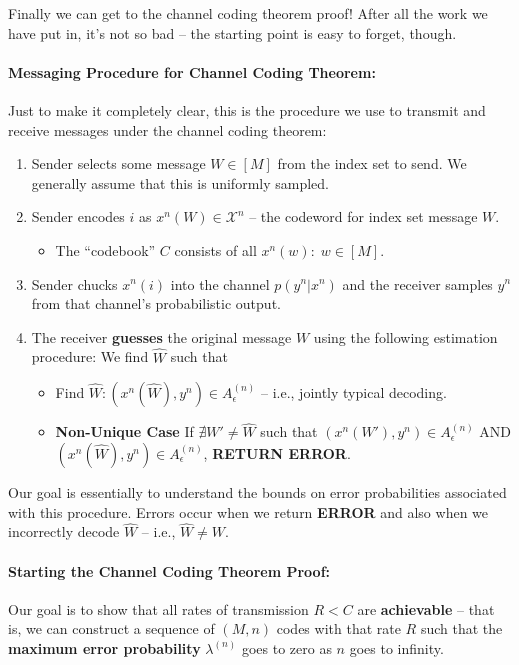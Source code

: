 \documentclass[a4paper,12pt]{report}
\begin{document}
Finally we can get to the channel coding theorem proof! After all the work we
have put in, it's not so bad -- the starting point is easy to forget, though.



\paragraph{Messaging Procedure for Channel Coding Theorem: } Just to make it
completely clear, this is the procedure we use to transmit and receive messages
under the channel coding theorem:
\begin{enumerate}
\item Sender selects some message $W\in [M]$ from the index set to send. We
generally assume that this is uniformly sampled. 
\item Sender encodes $i$ as $x^n(W) \in \mathcal X^n$ -- the codeword for index
set message $W$.
	\begin{itemize}
	\item The ``codebook'' $C$ consists of all $x^n(w): \; w\in [M]$. 
	\end{itemize}

\item Sender chucks $x^n(i)$ into the channel $p(y^n| x^n)$ and the receiver
samples $y^n$ from that channel's probabilistic output.
\item The receiver \textbf{guesses} the original message $W$ using the following
estimation procedure: We find $\hat W$ such that
	\begin{itemize}
	\item Find $\hat W: (x^n(\hat W), y^n) \in A_\epsilon^{(n)}$ -- i.e.,
	jointly typical decoding.
	\item \textbf{Non-Unique Case} If $\nexists W' \neq \hat W$ such that
	$(x^n(W'), y^n) \in A_\epsilon^{(n)}$ AND $(x^n(\hat W), y^n) \in
	A_\epsilon^{(n)}$, \textbf{RETURN ERROR}.
	\end{itemize}
\end{enumerate}

Our goal is essentially to understand the bounds on error probabilities
associated with this procedure. Errors occur when we return \textbf{ERROR} and
also when we incorrectly decode $\hat W$ -- i.e., $\hat W \neq W$.




\paragraph{Starting the Channel Coding Theorem Proof: } Our goal is to show that
all rates of transmission $R < C$ are \textbf{achievable} -- that is, we can
construct a sequence of $(M, n)$ codes with that rate $R$ such that the
\textbf{maximum error probability} $\lambda^{(n)}$ goes to zero as $n$ goes to
infinity.
\end{document}
